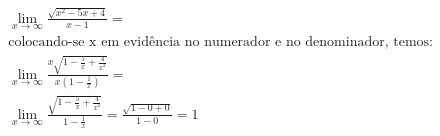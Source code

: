 \begin{ex}
\begin{align}
&\lim_{x\rightarrow \infty} \frac{\sqrt{x^2-5x+4}}{x-1}=\nonumber\\
&\text{colocando-se x em evidência no numerador e no denominador, temos:}\nonumber\\
&\lim_{x\rightarrow \infty} \frac{x\sqrt{1-\frac{5}{x}+\frac{4}{x^2}}}{x(1-\frac{1}{x})}=\nonumber\\
&\lim_{x\rightarrow \infty} \frac{\sqrt{1-\frac{5}{x}+\frac{4}{x^2}}}{1-\frac{1}{x}}=\frac{\sqrt{1-0+0}}{1-0}=1\nonumber
\end{align}
\end{ex}